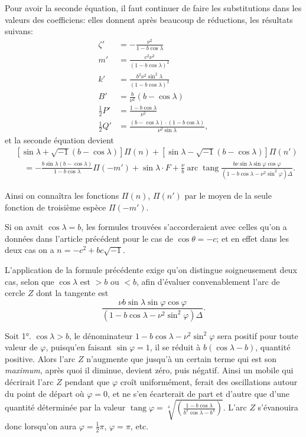 \documentclass{article}
\begin{document}
Pour avoir la seconde équation, il faut continuer de faire les substitutions dans les valeurs des coefficiens: elles donnent après beaucoup de réductions, les résultats suivans:
\[ \begin{aligned} \zeta'&=-\frac{\nu^{2}}{1-b\cos\lambda}\\ m'&=\frac{c^{2}\nu^{2}}{(1-b\cos\lambda)^{2}}\\ k'&=\frac{b^{2}\nu^{2}\sin^{2}\lambda}{(1-b\cos\lambda)^{2}}\\ B'&=\frac{b}{\nu^{2}}(b-\cos\lambda)\\ \tfrac{1}{2}P'&=\frac{1-b\cos\lambda}{\nu^{2}}\\ \tfrac{1}{2}Q'&=\frac{(b-\cos\lambda)\cdot(1-b\cos\lambda)}{\nu^{2}\sin\lambda}, \end{aligned} \]
et la seconde équation devient
\[ \begin{aligned} &[\sin\lambda+\sqrt{-1}(b-\cos\lambda)]\Pi(n)+[\sin\lambda-\sqrt{-1}(b-\cos\lambda)]\Pi(n')\\ &\quad=-\frac{b\sin\lambda(b-\cos\lambda)}{1-b\cos\lambda}\Pi(-m')+\sin\lambda\cdot F+\frac{\nu}{b}\operatorname{arc}\operatorname{tang}\frac{b\nu\sin\lambda\sin\varphi\cos\varphi}{(1-b\cos\lambda-\nu^{2}\sin^{2}\varphi)\Delta}. \end{aligned} \]

Ainsi on connaîtra les fonctions $\Pi(n)$, $\Pi(n')$ par le moyen de la seule fonction de troisième espèce $\Pi(-m')$.

Si on avait $\cos\lambda=b$, les formules trouvées s'accorderaient avec celles qu'on a données dans l'article précédent pour le cas de $\cos\theta=-c$; et en effet dans les deux cas on a $n=-c^{2}+bc\sqrt{-1}$.

L'application de la formule précédente exige qu'on distingue soigneusement deux cas, selon que $\cos\lambda$ est $>b$ ou $<b$, afin d'évaluer convenablement l'arc de cercle $Z$ dont la tangente est
\[ \frac{\nu b\sin\lambda\sin\varphi\cos\varphi}{(1-b\cos\lambda-\nu^{2}\sin^{2}\varphi)\Delta}. \]

Soit 1°. $\cos\lambda>b$, le dénominateur $1-b\cos\lambda-\nu^{2}\sin^{2}\varphi$ sera positif pour toute valeur de $\varphi$, puisqu'en faisant $\sin\varphi=1$, il se réduit à $b(\cos\lambda-b)$, quantité positive. Alors l'arc $Z$ n'augmente que jusqu'à un certain terme qui est son \emph{maximum}, après quoi il diminue, devient zéro, puis négatif. Ainsi un mobile qui décrirait l'arc $Z$ pendant que $\varphi$ croît uniformément, ferait des oscillations autour du point de départ où $\varphi=0$, et ne s'en écarterait de part et d'autre que d'une quantité déterminée par la valeur $\operatorname{tang}\varphi=\sqrt[4]{\left(\frac{1-b\cos\lambda}{b^{3}\cos\lambda-b^{4}}\right)}$. L'arc $Z$ s'évanouira donc lorsqu'on aura $\varphi=\frac{1}{2}\pi$, $\varphi=\pi$, etc.
\end{document}
